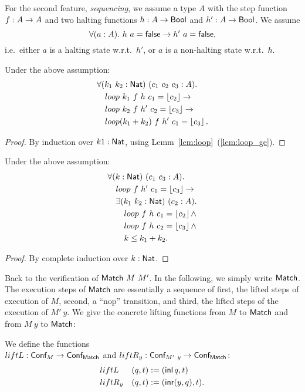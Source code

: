 For the second feature, \emph{sequencing}, we assume a type $A$ with the step function $f : A \rightarrow A$ and two halting functions
$h : A \rightarrow \textsf{Bool}$ and $h' : A \rightarrow \textsf{Bool}$.  We assume
\[
  \forall(a:A).~h~a = \textsf{false} \rightarrow h'~a = \textsf{false},
\]
i.e.\ either $a$ is a halting state w.r.t.\ $h'$, or $a$ is a non-halting state w.r.t.\ $h$.
\begin{lemma}
  \label{lem:loop_merge}
  Under the above assumption:
  \begin{align*}
    & \forall (k_1~k_2:\textsf{Nat})~(c_1~c_2~c_3 : A).\\
    & \quad loop~k_1~f~h ~c_1 = \left\lfloor {c_2} \right\rfloor \rightarrow\\
    & \quad loop~k_2~f~h'~c_2 = \left\lfloor {c_3} \right\rfloor \rightarrow\\
    & \quad loop (k_1+k_2)~f~h'~c_1 = \left\lfloor {c_3} \right\rfloor.
  \end{align*}
\end{lemma}
\begin{proof}
  By induction over $k1:\textsf{Nat}$, using Lemm~\ref{lem:loop}~(\ref{lem:loop_ge}).
\end{proof}
\begin{lemma}
  \label{lem:loop_split}
  Under the above assumption:
  \begin{align*}
    & \forall (k:\textsf{Nat})~(c_1~c_3 : A).\\
    & \quad loop~f~h'~c_1 = \left\lfloor {c_3} \right\rfloor \rightarrow \\
    & \quad \exists (k_1~k_2:\textsf{Nat})~(c_2:A).\\
    & \quad \quad loop~f~h~c_1 = \left\lfloor {c_2} \right\rfloor \land\\
    & \quad \quad loop~f~h~c_2 = \left\lfloor {c_3} \right\rfloor \land\\
    & \quad \quad k \leq k_1 + k_2.
  \end{align*}
\end{lemma}
\begin{proof}
  By complete induction over $k:\textsf{Nat}$.
\end{proof}


Back to the verification of $\textsf{Match}~M~M'$.  In the following, we simply write $\textsf{Match}$.  The execution steps of $\textsf{Match}$ are essentially a sequence of
first, the lifted steps of execution of $M$, second, a ``nop'' transition, and third, the lifted steps of the execution of $M'~y$.  We give the
concrete lifting functions from $M$ to $\textsf{Match}$ and from $M~y$ to $\textsf{Match}$:
\begin{definition}
  We define the functions \\$liftL : \textsf{Conf}_M \rightarrow \textsf{Conf}_{\textsf{Match}}$ and $liftR_y : \textsf{Conf}_{M'~y} \rightarrow \textsf{Conf}_{\textsf{Match}}$:
  \begin{alignat*}{2}
    & liftL   & (q, t) &:= (\operatorname{\textsf{inl}} q,      t) \\
    & liftR_y & (q, t) &:= (\operatorname{\textsf{inr}} (y, q), t).
  \end{alignat*}
\end{definition}

